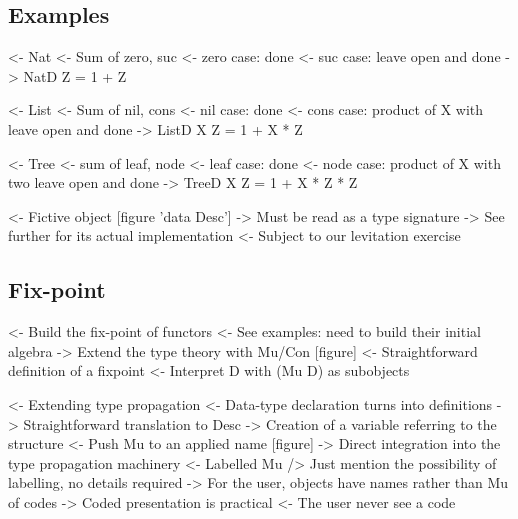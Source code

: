 \documentclass{article}
\newenvironment{structure}{\footnotesize\verbatim}{\endverbatim}
\begin{document}
\subsection{Examples}

\begin{structure}
<- Nat
    <- Sum of zero, suc
    <- zero case: done
    <- suc case: leave open and done
    -> NatD Z = 1 + Z
\end{structure}

\begin{structure}
<- List
    <- Sum of nil, cons
    <- nil case: done
    <- cons case: product of X with leave open and done
    -> ListD X Z = 1 + X * Z
\end{structure}

\begin{structure}
<- Tree
    <- sum of leaf, node
    <- leaf case: done
    <- node case: product of X with two leave open and done
    -> TreeD X Z = 1 + X * Z * Z
\end{structure}

\begin{structure}
<- Fictive object [figure 'data Desc']
    -> Must be read as a type signature
    -> See further for its actual implementation
        <- Subject to our levitation exercise
\end{structure}

\subsection{Fix-point}

\begin{structure}
<- Build the fix-point of functors
    <- See examples: need to build their initial algebra
    -> Extend the type theory with Mu/Con [figure]
        <- Straightforward definition of a fixpoint
            <- Interpret D with (Mu D) as subobjects
\end{structure}

\begin{structure}
<- Extending type propagation
    <- Data-type declaration turns into definitions
        -> Straightforward translation to Desc
        -> Creation of a variable referring to the structure
    <- Push Mu to an applied name [figure]
        -> Direct integration into the type propagation machinery
    <- Labelled Mu
        /> Just mention the possibility of labelling, no details required
        -> For the user, objects have names rather than Mu of codes
    -> Coded presentation is practical
        <- The user never see a code
\end{structure}
\end{document}
